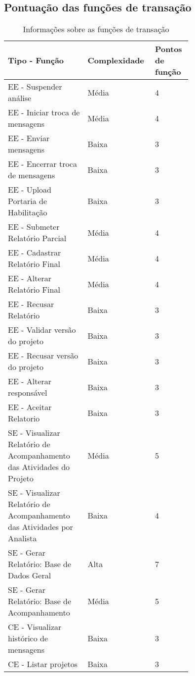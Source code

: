     
    
    
\vfill
\pagebreak
  \subsection{Pontuação das funções de transação}
    
	\begin{table*}[!h]
	\centering
	\caption{Informações sobre as funções de transação}
	\label{funcoes_transacao}
	  \begin{tabular}{|p{0.40\linewidth}|p{0.20\linewidth}|p{0.14\linewidth}|}
	\hline
	\textbf{Tipo - Função} & \textbf{Complexidade} & \textbf{Pontos de função} \\
	\hline
	  EE - Suspender análise & Média & 4 \\ \hline
	  EE - Iniciar troca de mensagens & Média & 4 \\ \hline
	  EE - Enviar mensagens & Baixa & 3\\ \hline
	  EE - Encerrar troca de mensagens & Baixa & 3 \\ \hline
	  EE - Upload Portaria de Habilitação &Baixa & 3\\ \hline
	  EE - Submeter Relatório Parcial & Média & 4 \\ \hline
	  EE - Cadastrar Relatório Final & Média & 4  \\ \hline
	  EE - Alterar Relatório Final & Média & 4  \\ \hline
	  EE - Recusar Relatório & Baixa & 3\\ \hline
	  EE - Validar versão do projeto & Baixa &3 \\ \hline
	  EE - Recusar versão do projeto & Baixa & 3\\ \hline
	  EE - Alterar responsável & Baixa & 3\\ \hline
	  EE - Aceitar Relatorio & Baixa&3 \\ \hline
	  SE - Visualizar Relatório de Acompanhamento das Atividades do Projeto & Média & 5 \\ \hline
	  SE - Visualizar Relatório de Acompanhamento das Atividades por Analista & Baixa & 4\\ \hline
	  SE - Gerar Relatório: Base de Dados Geral & Alta& 7\\ \hline
	  SE - Gerar Relatório: Base de Acompanhamento & Média & 5\\ \hline
	  CE - Visualizar histórico de mensagens & Baixa& 3\\ \hline
	  CE - Listar projetos & Baixa& 3\\ \hline

\end{tabular}
\end{table*}
